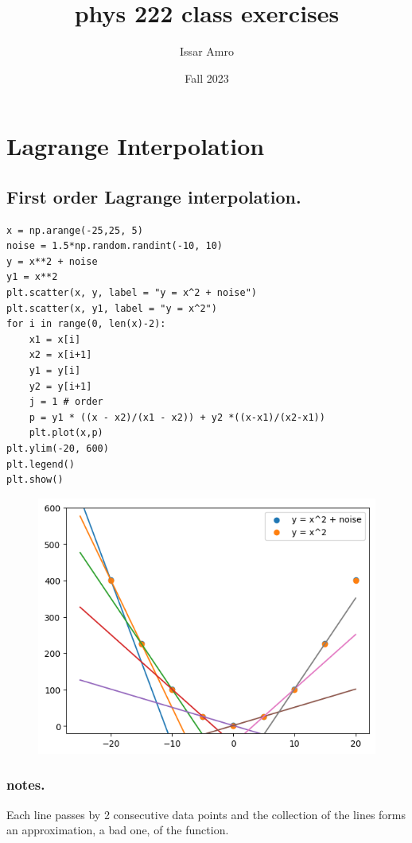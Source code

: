 \documentclass{article}
\title{phys 222 class exercises}
\author{Issar Amro}
\date{Fall 2023}
\begin{document}
\maketitle
\section{Lagrange Interpolation}
\subsection{First order Lagrange interpolation.}
\begin{verbatim}
x = np.arange(-25,25, 5)
noise = 1.5*np.random.randint(-10, 10)
y = x**2 + noise
y1 = x**2
plt.scatter(x, y, label = "y = x^2 + noise")
plt.scatter(x, y1, label = "y = x^2")
for i in range(0, len(x)-2):
    x1 = x[i]
    x2 = x[i+1]
    y1 = y[i]
    y2 = y[i+1]
    j = 1 # order
    p = y1 * ((x - x2)/(x1 - x2)) + y2 *((x-x1)/(x2-x1))
    plt.plot(x,p)
plt.ylim(-20, 600)
plt.legend()
plt.show()
\end{verbatim}

\begin{figure}[H]
    \centering
\includegraphics[scale = 0.8]{1stOrderLagrange.png}
\end{figure}
\subsubsection*{notes.}
Each line passes by 2 consecutive data points and the collection of the lines forms an approximation, a bad one, of the function.
\end{document}
